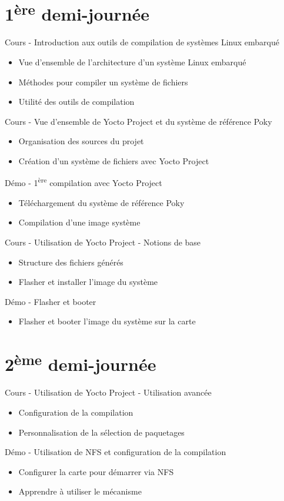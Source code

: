 \documentclass[a4paper,12pt,obeyspaces,spaces,hyphens]{article}
\begin{document}
\section{1\textsuperscript{ère} demi-journée}

\feagendaonecolumn
{Cours - Introduction aux outils de compilation de systèmes Linux embarqué}
{
  \begin{itemize}
  \item Vue d'ensemble de l'architecture d'un système Linux embarqué
  \item Méthodes pour compiler un système de fichiers
  \item Utilité des outils de compilation
  \end{itemize}
}

\feagendatwocolumn
{Cours - Vue d'ensemble de Yocto Project et du système de référence Poky}
{
  \begin{itemize}
  \item Organisation des sources du projet
  \item Création d'un système de fichiers avec Yocto Project
  \end{itemize}
}
{Démo - 1\textsuperscript{ère} compilation avec Yocto Project}
{
  \begin{itemize}
  \item Téléchargement du système de référence Poky
  \item Compilation d'une image système
 \end{itemize}
}

\newpage
\feagendatwocolumn
{Cours - Utilisation de Yocto Project - Notions de base}
{
  \begin{itemize}
  \item Structure des fichiers générés
  \item Flasher et installer l'image du système
  \end{itemize}
}
{Démo - Flasher et booter}
{
  \begin{itemize}
  \item Flasher et booter l'image du système sur la carte
  \end{itemize}
}

\section{2\textsuperscript{ème} demi-journée}

\feagendatwocolumn
{Cours - Utilisation de Yocto Project - Utilisation avancée}
{
  \begin{itemize}
  \item Configuration de la compilation
  \item Personnalisation de la sélection de paquetages
  \end{itemize}
}
{Démo - Utilisation de NFS et configuration de la compilation}
{
  \begin{itemize}
  \item Configurer la carte pour démarrer via NFS
  \item Apprendre à utiliser le mécanisme 
  \end{itemize}
}
\\
\end{document}
